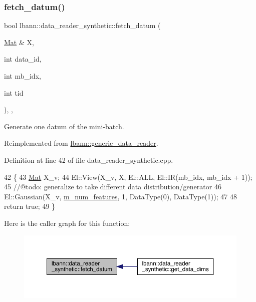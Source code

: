 \subsubsection{\texorpdfstring{fetch\+\_\+datum()}{fetch\_datum()}}
{\footnotesize\ttfamily bool lbann\+::data\+\_\+reader\+\_\+synthetic\+::fetch\+\_\+datum (\begin{DoxyParamCaption}\item[{\hyperlink{base_8hpp_a68f11fdc31b62516cb310831bbe54d73}{Mat} \&}]{X,  }\item[{int}]{data\+\_\+id,  }\item[{int}]{mb\+\_\+idx,  }\item[{int}]{tid }\end{DoxyParamCaption})\hspace{0.3cm}{\ttfamily [override]}, {\ttfamily [protected]}, {\ttfamily [virtual]}}



Generate one datum of the mini-\/batch. 



Reimplemented from \hyperlink{classlbann_1_1generic__data__reader_a0a3cd87ed4a7057df185e0087f2d21c1}{lbann\+::generic\+\_\+data\+\_\+reader}.



Definition at line 42 of file data\+\_\+reader\+\_\+synthetic.\+cpp.


\begin{DoxyCode}
42                                                                                 \{
43   \hyperlink{base_8hpp_a68f11fdc31b62516cb310831bbe54d73}{Mat} X\_v;
44   El::View(X\_v, X, El::ALL, El::IR(mb\_idx, mb\_idx + 1));
45   \textcolor{comment}{//@todo: generalize to take different data distribution/generator}
46   El::Gaussian(X\_v, \hyperlink{classlbann_1_1data__reader__synthetic_a18f0ba6014a0f1edec24c7c3c109c520}{m\_num\_features}, 1, DataType(0), DataType(1));
47 
48   \textcolor{keywordflow}{return} \textcolor{keyword}{true};
49 \}
\end{DoxyCode}
Here is the caller graph for this function\+:\nopagebreak
\begin{figure}[H]
\begin{center}
\leavevmode
\includegraphics[width=350pt]{classlbann_1_1data__reader__synthetic_af90ce15d2c6f30a921ffa54ee5547565_icgraph}
\end{center}
\end{figure}
\mbox{\label{classlbann_1_1data__reader__synthetic_a5ee6a8ee02a6ff788988ae427ccf4aa5}} 

